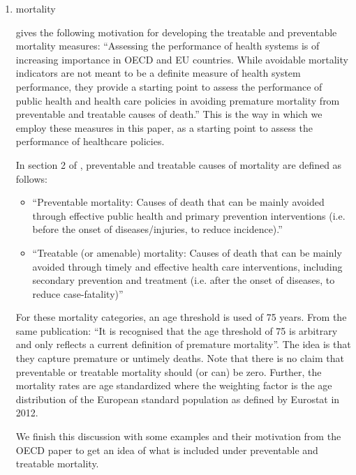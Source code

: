 \documentclass[a4paper,12pt]{article}
\begin{document}
\begin{enumerate}
\item mortality
\label{sec:orgc3fa365}
\label{sec:mortality}

\cite{OECD_avoidable_mortality} gives the following motivation for developing the treatable and preventable mortality measures: ``Assessing the performance of health systems is of increasing importance in OECD and EU countries. While avoidable mortality indicators are not meant to be a definite measure of health system performance, they provide a starting point to assess the performance of public health and health care policies in avoiding premature mortality from preventable and treatable causes of death.'' This is the way in which we employ these measures in this paper, as a starting point to assess the performance of healthcare policies. 

In section 2 of \cite{OECD_avoidable_mortality}, preventable and treatable causes of mortality are defined as follows:
\begin{itemize}
\item ``Preventable mortality: Causes of death that can be mainly avoided through effective public health and primary prevention interventions (i.e. before the onset of diseases/injuries, to reduce incidence).''
\item ``Treatable (or amenable) mortality: Causes of death that can be mainly avoided through timely and effective health care interventions, including secondary prevention and treatment (i.e. after the onset of diseases, to reduce case-fatality)''
\end{itemize}

For these mortality categories, an age threshold is used of 75 years. From the same publication: ``It is recognised that the age threshold of 75 is arbitrary and only reflects a current definition of premature mortality''. The idea is that they capture premature or untimely deaths. Note that there is no claim that preventable or treatable mortality should (or can) be zero. Further, the mortality rates are age standardized where the weighting factor is the age distribution of the European standard population as defined by Eurostat in 2012.

We finish this discussion with some examples and their motivation from the OECD paper to get an idea of what is included under preventable and treatable mortality.


\end{enumerate}
\end{document}
